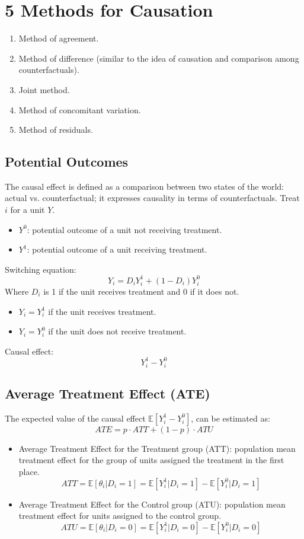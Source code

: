 \documentclass{article}
\begin{document}
\section*{5 Methods for Causation}
\begin{enumerate}
    \item Method of agreement.
    \item Method of difference (similar to the idea of causation and comparison among counterfactuals).
    \item Joint method.
    \item Method of concomitant variation.
    \item Method of residuals.
\end{enumerate}

\subsection*{Potential Outcomes}
The causal effect is defined as a comparison between two states of the world: actual vs. counterfactual; it expresses causality in terms of counterfactuals. Treat \(i\) for a unit \(Y\).

\begin{itemize}
    \item \(Y^0\): potential outcome of a unit not receiving treatment.
    \item \(Y^1\): potential outcome of a unit receiving treatment.
\end{itemize}

Switching equation:
\[
Y_i = D_i Y_i^1 + (1 - D_i) Y_i^0
\]
Where \(D_i\) is 1 if the unit receives treatment and 0 if it does not.
\begin{itemize}
    \item \(Y_i = Y_i^1\) if the unit receives treatment.
    \item \(Y_i = Y_i^0\) if the unit does not receive treatment.
\end{itemize}
Causal effect:
\[
Y_i^1 - Y_i^0
\]

\subsection*{Average Treatment Effect (ATE)}
The expected value of the causal effect \(\mathbb{E}[Y_i^1 - Y_i^0]\), can be estimated as:
\[
ATE = p \cdot ATT + (1 - p) \cdot ATU
\]
\begin{itemize}
    \item Average Treatment Effect for the Treatment group (ATT): population mean treatment effect for the group of units assigned the treatment in the first place.
    \[
    ATT = \mathbb{E}[\theta_i | D_i = 1] = \mathbb{E}[Y_i^1 | D_i = 1] - \mathbb{E}[Y_i^0 | D_i = 1]
    \]
    \item Average Treatment Effect for the Control group (ATU): population mean treatment effect for units assigned to the control group.
    \[
    ATU = \mathbb{E}[\theta_i | D_i = 0] = \mathbb{E}[Y_i^1 | D_i = 0] - \mathbb{E}[Y_i^0 | D_i = 0]
    \]
\end{itemize}
\end{document}
